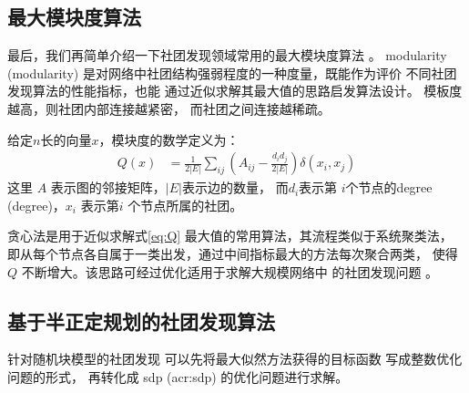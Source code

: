 

\subsection{最大模块度算法}

最后，我们再简单介绍一下社团发现领域常用的最大模块度算法
\cite{newman2006modularity}。
\gls{modularity} (\glsdesc{modularity})
是对网络中社团结构强弱程度的一种度量，既能作为评价
不同社团发现算法的性能指标，也能
通过近似求解其最大值的思路启发算法设计。
模板度越高，则社团内部连接越紧密，
而社团之间连接越稀疏。

给定$n$长的向量$x$，模块度的数学定义为：
\begin{align}\label{eq:Q}
  Q(x) &= \frac{1}{2 |E|} \sum_{ij} 
  \left(A_{ij} - \frac{d_i d_j}{2 |E|} \right) \delta(x_i, x_j)
\end{align}
这里 $A$ 表示图的邻接矩阵，$|E|$表示边的数量，
而$d_i$表示第
$i$个节点的\gls{degree} (\glsdesc{degree})，$x_i$ 表示第$i$
个节点所属的社团。

贪心法是用于近似求解式\eqref{eq:Q}
最大值的常用算法，其流程类似于系统聚类法，
即从每个节点各自属于一类出发，通过中间指标最大的方法每次聚合两类，
使得 $Q$ 不断增大。该思路可经过优化适用于求解大规模网络中
的社团发现问题 \cite{clauset2004finding}。

\subsection{基于半正定规划的社团发现算法}

针对随机块模型的社团发现
可以先将最大似然方法获得的目标函数
写成整数优化问题的形式，
再转化成 \gls{sdp} (\gls{acr:sdp}) 的优化问题进行求解。

